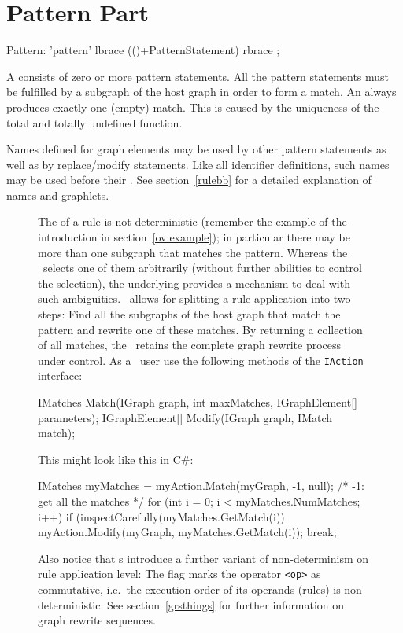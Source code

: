 \section{Pattern Part}
\label{patternpart}
\begin{rail}
  Pattern: 'pattern' lbrace (()+PatternStatement) rbrace ;
\end{rail}
A  consists of zero or more pattern statements. 
All the pattern statements must be fulfilled by a subgraph of the host graph in order to form a match. 
An  always produces exactly one (empty) match. 
This is caused by the uniqueness of the total and totally undefined function.

Names defined for graph elements may be used by other pattern statements as well as by replace/modify statements. 
Like all identifier definitions, such names may be used before their . 
See section~\ref{rulebb} for a detailed explanation of names and graphlets.
\begin{figure}[htbp]
\begin{note}
\label{note:indeterminism}
The  of a rule is not deterministic (remember the example of the introduction in section~\ref{ov:example}); in particular there may be more than one subgraph that matches the pattern. 
Whereas the \GrShell\ selects one of them arbitrarily (without further abilities to control the selection), the underlying \LibGr{} provides a mechanism to deal with such ambiguities. 
\LibGr\ allows for splitting a rule application into two steps: Find all the subgraphs of the host graph that match the pattern and rewrite one of these matches. 
By returning a collection of all matches, the \LibGr\ retains the complete graph rewrite process under control.
As a \LibGr\ user use the following methods of the \texttt{IAction} interface:
\begin{csharplet}
IMatches Match(IGraph graph, int maxMatches, IGraphElement[] parameters);
IGraphElement[] Modify(IGraph graph, IMatch match);
\end{csharplet}
This might look like this in C\#:
\begin{csharplet}
IMatches myMatches = myAction.Match(myGraph, -1, null); /* -1: get all the matches */
for (int i = 0;  i < myMatches.NumMatches; i++)
{
	if (inspectCarefully(myMatches.GetMatch(i))
	{
		myAction.Modify(myGraph, myMatches.GetMatch(i));
		break;
  	}
}
\end{csharplet}

Also notice that s introduce a further variant of non-determinism on rule application level: 
The  flag marks the operator \texttt{<op>} as commutative, i.e.\ the execution order of its operands (rules) is non-deterministic. 
See section~\ref{grsthings} for further information on graph rewrite sequences.
\end{note}
\end{figure}

